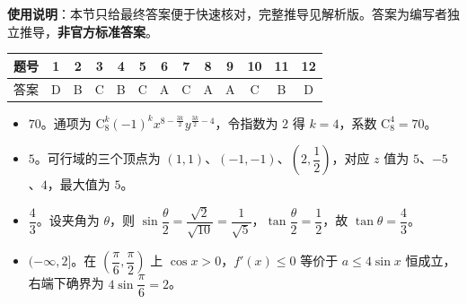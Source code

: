 
\begin{gknotice}
\textbf{使用说明}：本节只给最终答案便于快速核对，完整推导见解析版。答案为编写者独立推导，\textbf{非官方标准答案}。
\end{gknotice}

\begin{center}\begin{tabular}{ccccccccccccc}
\toprule
题号 & 1 & 2 & 3 & 4 & 5 & 6 & 7 & 8 & 9 & 10 & 11 & 12 \\
\midrule
答案 & D & B & C & B & C & A & C & A & A & C & B & D \\
\bottomrule
\end{tabular}\end{center}

\begin{itemize}[leftmargin=2.6em]
  \item[\textbf{13.}] $70$。通项为 $\mathrm C_8^k(-1)^k x^{8-\frac{3k}{2}}y^{\frac{3k}{2}-4}$，令指数为 $2$ 得 $k=4$，系数 $\mathrm C_8^4=70$。
  \item[\textbf{14.}] $5$。可行域的三个顶点为 $(1,1)$、$(-1,-1)$、$\left(2,\dfrac12\right)$，对应 $z$ 值为 $5$、$-5$、$4$，最大值为 $5$。
  \item[\textbf{15.}] $\dfrac43$。设夹角为 $\theta$，则 $\sin\dfrac{\theta}{2}=\dfrac{\sqrt2}{\sqrt{10}}=\dfrac1{\sqrt5}$，$\tan\dfrac{\theta}{2}=\dfrac12$，故 $\tan\theta=\dfrac43$。
  \item[\textbf{16.}] $(-\infty,2]$。在 $\left(\dfrac\pi6,\dfrac\pi2\right)$ 上 $\cos x>0$，$f'(x)\leqslant0$ 等价于 $a\leqslant4\sin x$ 恒成立，右端下确界为 $4\sin\dfrac\pi6=2$。
\end{itemize}

